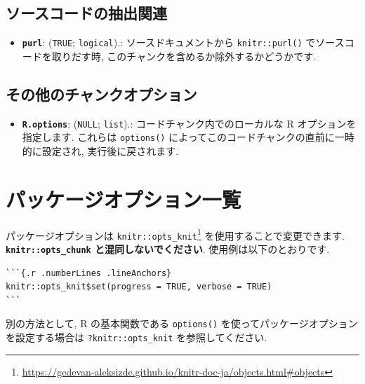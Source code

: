 \documentclass[
  11pt,
  lualatex,ja=standard,jafont=noto]{bxjsreport}
\providecommand{\tightlist}{%
  \setlength{\itemsep}{0pt}\setlength{\parskip}{0pt}}
\renewcommand{\href}[2]{#2\footnote{\url{#1}}}
\begin{document}
\hypertarget{ux30bdux30fcux30b9ux30b3ux30fcux30c9ux306eux62bdux51faux95a2ux9023}{%
\subsection{ソースコードの抽出関連}\label{ux30bdux30fcux30b9ux30b3ux30fcux30c9ux306eux62bdux51faux95a2ux9023}}

\begin{itemize}
\tightlist
\item
  \textbf{\texttt{purl}}: (\texttt{TRUE}; \texttt{logical}).: ソースドキュメントから \texttt{knitr::purl()} でソースコードを取りだす時, このチャンクを含めるか除外するかどうかです.
\end{itemize}

\hypertarget{ux305dux306eux4ed6ux306eux30c1ux30e3ux30f3ux30afux30aaux30d7ux30b7ux30e7ux30f3}{%
\subsection{その他のチャンクオプション}\label{ux305dux306eux4ed6ux306eux30c1ux30e3ux30f3ux30afux30aaux30d7ux30b7ux30e7ux30f3}}

\begin{itemize}
\tightlist
\item
  \textbf{\texttt{R.options}}: (\texttt{NULL}; \texttt{list}).: コードチャンク内でのローカルな R オプションを指定します. これらは \texttt{options()} によってこのコードチャンクの直前に一時的に設定され, 実行後に戻されます.
\end{itemize}

\hypertarget{package-options}{%
\section{パッケージオプション一覧}\label{package-options}}

パッケージオプションは \href{https://gedevan-aleksizde.github.io/knitr-doc-ja/objects.html\#objects}{\texttt{knitr::opts\_knit}} を使用することで変更できます. \textbf{\texttt{knitr::opts\_chunk} と混同しないでください}. 使用例は以下のとおりです.

\begin{verbatim}
```{.r .numberLines .lineAnchors}
knitr::opts_knit$set(progress = TRUE, verbose = TRUE)
```
\end{verbatim}

別の方法として, R の基本関数である \texttt{options()} を使ってパッケージオプションを設定する場合は \texttt{?knitr::opts\_knit} を参照してください.
\end{document}
